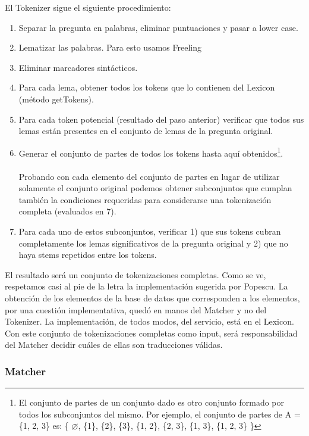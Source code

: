 \medskip

El Tokenizer sigue el siguiente procedimiento:
\begin{enumerate}
\item Separar la pregunta en palabras, eliminar puntuaciones y pasar a lower case.
\item Lematizar las palabras. Para esto usamos Freeling
\item Eliminar marcadores sintácticos.
\item Para cada lema, obtener todos los tokens que lo contienen del Lexicon (método getTokens).
\item Para cada token potencial (resultado del paso anterior) verificar que todos sus lemas están presentes en el conjunto de lemas de la pregunta original.
\item Generar el conjunto de partes de todos los tokens hasta aquí obtenidos\footnote{El conjunto de partes de un conjunto dado es otro conjunto formado por todos los subconjuntos del mismo. Por ejemplo, el conjunto de partes de A = \{1, 2, 3\} es: \{ $\varnothing$, \{1\}, \{2\}, \{3\}, \{1, 2\}, \{2, 3\}, \{1, 3\}, \{1, 2, 3\} \}}. \\ \\
	Probando con cada elemento del conjunto de partes en lugar de utilizar solamente el conjunto original podemos obtener subconjuntos que cumplan también la condiciones requeridas para considerarse una tokenización completa (evaluados en 7).
\item Para cada uno de estos subconjuntos, verificar 1) que sus tokens cubran completamente los lemas significativos de la pregunta original y 2) que no haya stems repetidos entre los tokens.
\end{enumerate}

El resultado será un conjunto de tokenizaciones completas. Como se ve, respetamos casi al pie de la letra la implementación sugerida por Popescu. La obtención de los elementos de la base de datos que corresponden a los elementos, por una cuestión implementativa, quedó en manos del Matcher y no del Tokenizer. La implementación, de todos modos, del servicio, está en el Lexicon. Con este conjunto de tokenizaciones completas como input, será responsabilidad del Matcher decidir cuáles de ellas son traducciones válidas.

\subsubsection*{Matcher}
\label{subsubsec:matcher}

